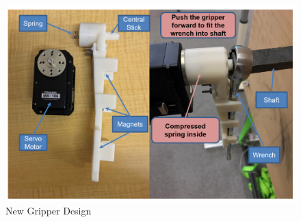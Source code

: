 \documentclass{standalone}
\begin{document}

 \begin{figure}%
    \begin{center}
    \includegraphics[keepaspectratio=true, width=1\linewidth,
      height=0.3\textheight]{sections//task2//images//gripper.png}
      \end{center}
    \caption{New Gripper Design}
    \label{gripper}
 \end{figure}
\end{document}
